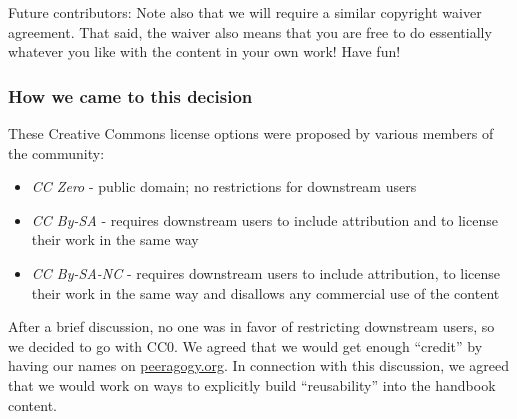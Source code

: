 Future contributors: Note also that we will require a similar copyright
waiver agreement. That said, the waiver also means that you are free to
do essentially whatever you like with the content in your own work! Have
fun!

\subsubsection{How we came to this decision}

These Creative Commons license options were proposed by various members
of the community:

\begin{itemize}
\item
  \emph{CC Zero} - public domain; no restrictions for downstream users
\item
  \emph{CC By-SA} - requires downstream users to include attribution and
  to license their work in the same way
\item
  \emph{CC By-SA-NC} - requires downstream users to include attribution,
  to license their work in the same way and disallows any commercial use
  of the content
\end{itemize}
After a brief discussion, no one was in favor of restricting downstream
users, so we decided to go with CC0. We agreed that we would get enough
``credit'' by having our names on
\href{http://peeragogy.org/}{peeragogy.org}. In connection with this
discussion, we agreed that we would work on ways to explicitly build
``reusability'' into the handbook content.
